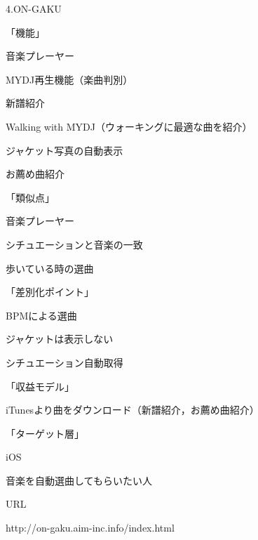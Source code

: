 \par
4.ON-GAKU
\par
「機能」
\par
音楽プレーヤー
\par
MYDJ再生機能（楽曲判別）
\par
新譜紹介
\par
Walking with MYDJ（ウォーキングに最適な曲を紹介）
\par
ジャケット写真の自動表示
\par
お薦め曲紹介
\par
「類似点」
\par
音楽プレーヤー
\par
シチュエーションと音楽の一致
\par
歩いている時の選曲
\par
「差別化ポイント」
\par
BPMによる選曲
\par
ジャケットは表示しない
\par
シチュエーション自動取得
\par
「収益モデル」
\par
iTunesより曲をダウンロード（新譜紹介，お薦め曲紹介）
\par
「ターゲット層」
\par
iOS
\par
音楽を自動選曲してもらいたい人
\par
URL
\par
http://on-gaku.aim-inc.info/index.html
\\

